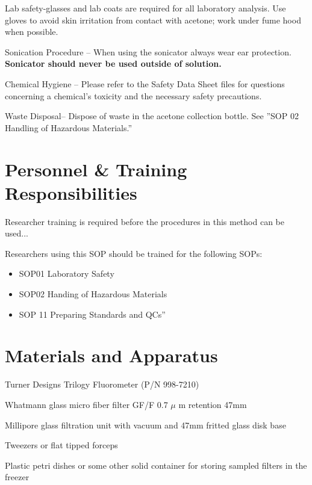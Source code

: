 \documentclass[12pt]{../SOP3}\usepackage[]{graphicx}\usepackage[]{color}
\begin{document}
\NP Lab safety-glasses and lab coats are required for all laboratory analysis. Use gloves to avoid skin irritation from contact with acetone; work under fume hood when possible. 

\NP Sonication Procedure -- When using the sonicator always wear ear protection. \textbf {Sonicator should never be used outside of solution.}

\NP Chemical Hygiene -- Please refer to the Safety Data Sheet files for questions concerning a chemical's toxicity and the necessary safety precautions.

\NP Waste Disposal-- Dispose of waste in the acetone collection bottle. See ''SOP 02 Handling of Hazardous Materials.'' %

\section{Personnel \& Training Responsibilities}

\NP Researcher training is required before the procedures in this method can be used... 

\NP Researchers using this SOP should be trained for the following SOPs:

\begin{itemize}
  \item SOP01 Laboratory Safety
  \item SOP02 Handing of Hazardous Materials
\item SOP 11 Preparing Standards and QCs'' %
\end{itemize}

\section{Materials and Apparatus}

\NP Turner Designs Trilogy Fluorometer (P/N 998-7210)

\NP Whatmann glass micro fiber filter GF/F 0.7 $\mu$  m retention 47mm 

\NP Millipore glass filtration unit with vacuum and 47mm fritted glass disk base 

\NP Tweezers or flat tipped forceps

\NP Plastic petri dishes or some other solid container for storing sampled filters in the freezer
\end{document}
